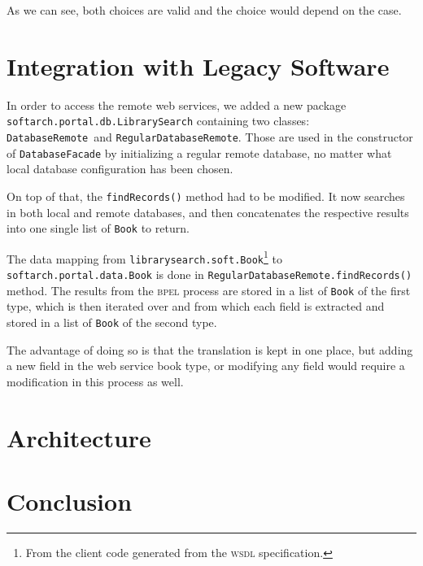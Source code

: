 \documentclass[a4paper,10pt]{article}
\begin{document}
 As we can see, both choices are valid and the choice would depend on the case.



\section{Integration with Legacy Software}
In order to access the remote web services, we added a new package \texttt{softarch.portal.db.LibrarySearch} containing two classes: \texttt{DatabaseRemote} and \texttt{RegularDatabaseRemote}.
Those are used in the constructor of \texttt{DatabaseFacade} by initializing a regular remote database, no matter what local database configuration has been chosen.

On top of that, the \texttt{findRecords()} method had to be modified.
It now searches in both local and remote databases, and then concatenates the respective results into one single list of \texttt{Book} to return.

The data mapping from \texttt{librarysearch.soft.Book}\footnote{From the client code generated from the \textsc{wsdl} specification.} to \texttt{softarch.portal.data.Book} is done in \texttt{RegularDatabaseRemote.findRecords()} method.
The results from the \textsc{bpel} process are stored in a list of \texttt{Book} of the first type, which is then iterated over and from which each field is extracted and stored in a list of \texttt{Book} of the second type.

The advantage of doing so is that the translation is kept in one place, but adding a new field in the web service book type, or modifying any field would require a modification in this process as well.

\section{Architecture}

\section{Conclusion}
\end{document}

